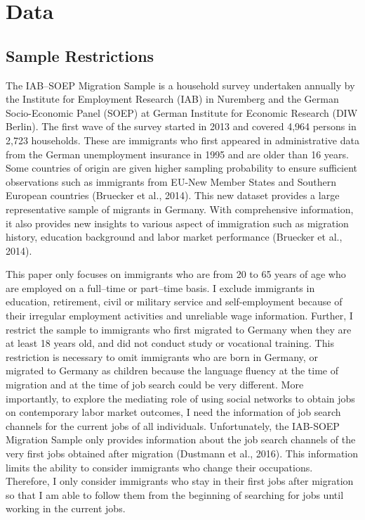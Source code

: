 \documentclass[12pt,a4paper]{article}
\begin{document}

\section{Data}
\subsection{Sample Restrictions}

The IAB--SOEP Migration Sample is a household survey undertaken annually by the Institute for Employment Research (IAB) in Nuremberg and the German Socio-Economic Panel (SOEP) at German Institute for Economic Research (DIW Berlin). The first wave of the survey started in 2013 and covered 4,964 persons in 2,723 households. These are immigrants who first appeared in administrative data from the German unemployment insurance in 1995 and are older than 16 years. Some countries of origin are given higher sampling probability to ensure sufficient observations such as immigrants from EU-New Member States and Southern European countries (Bruecker et al., 2014). This new dataset provides a large representative sample of migrants in Germany. With comprehensive information, it also provides new insights to various aspect of immigration such as migration history, education background and labor market performance (Bruecker et al., 2014).

This paper only focuses on immigrants who are from 20 to 65 years of age who are employed on a full--time or part--time basis. I exclude immigrants in education, retirement, civil or military service and self-employment because of their irregular employment activities and unreliable wage information. Further, I restrict the sample to immigrants who first migrated to Germany when they are at least 18 years old, and did not conduct study or vocational training. This restriction is necessary to omit immigrants who are born in Germany, or migrated to Germany as children because the language fluency at the time of migration and at the time of job search could be very different. More importantly, to explore the mediating role of using social networks to obtain jobs on contemporary labor market outcomes, I need the information of job search channels for the current jobs of all individuals. Unfortunately, the IAB-SOEP Migration Sample only provides information about the job search channels of the very first jobs obtained after migration (Dustmann et al., 2016). This information limits the ability to consider immigrants who change their occupations. Therefore, I only consider immigrants who stay in their first jobs after migration so that I am able to follow them from the beginning of searching for jobs until working in the current jobs. 
\end{document}

